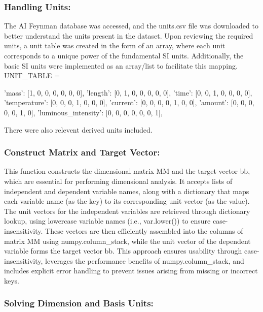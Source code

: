 \documentclass{article}
\begin{document}
\subsubsection{Handling Units:}


The AI Feynman database was accessed, and the units.csv file was downloaded to better understand the units present in the dataset. Upon reviewing the required units, a unit table was created in the form of an array, where each unit corresponds to a unique power of the fundamental SI units. Additionally, the basic SI units were implemented as an array/list to facilitate this mapping.\\


UNIT_TABLE = {

    'mass':                 [1, 0, 0, 0, 0, 0, 0], 
    'length':               [0, 1, 0, 0, 0, 0, 0],
    'time':                 [0, 0, 1, 0, 0, 0, 0],
    'temperature':          [0, 0, 0, 1, 0, 0, 0],
    'current':              [0, 0, 0, 0, 1, 0, 0],
    'amount':               [0, 0, 0, 0, 0, 1, 0], 
    'luminous_intensity':   [0, 0, 0, 0, 0, 0, 1],


There were also relevent derived units included.\\ 

\subsubsection{Construct Matrix and Target Vector:}

This function constructs the dimensional matrix MM and the target vector bb, which are essential for performing dimensional analysis. It accepts lists of independent and dependent variable names, along with a dictionary that maps each variable name (as the key) to its corresponding unit vector (as the value). The unit vectors for the independent variables are retrieved through dictionary lookup, using lowercase variable names (i.e., var.lower()) to ensure case-insensitivity. These vectors are then efficiently assembled into the columns of matrix MM using numpy.column_stack, while the unit vector of the dependent variable forms the target vector bb. This approach ensures usability through case-insensitivity, leverages the performance benefits of numpy.column_stack, and includes explicit error handling to prevent issues arising from missing or incorrect keys.\\





\subsubsection{Solving Dimension and Basis Units:}

}
\end{document}
